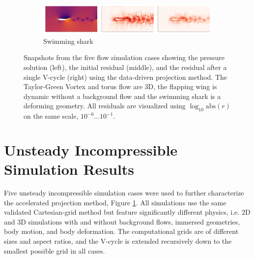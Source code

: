 \documentclass[review]{elsarticle}
\begin{document}
\begin{figure}
    \begin{subfigure}[b]{\textwidth}
        \centering
        \includegraphics[width=\textwidth]{figures/sharktriple.png}
        \caption{Swimming shark}
    \end{subfigure}
    \hfill
    \caption{Snapshots from the five flow simulation cases showing the pressure solution (left), the initial residual (middle), and the residual after a single V-cycle (right) using the data-driven projection method. The Taylor-Green Vortex and torus flow are 3D, the flapping wing is dynamic without a background flow and the swimming shark is a deforming geometry. All residuals are visualized using $\log_{10}\text{abs}(r)$ on the same scale, $10^{-6} \ldots 10^{-1}$.}
    \label{fig:simulation cases}
\end{figure}

\section{Unsteady Incompressible Simulation Results}

Five unsteady incompressible simulation cases were used to further characterize the accelerated projection method, Figure \ref{fig:simulation cases}. All simulations use the same validated Cartesian-grid method \cite{maertens2015accurate} but feature significantly different physics, i.e. 2D and 3D simulations with and without background flows, immersed geometries, body motion, and body deformation. The computational grids are of different sizes and aspect ratios, and the V-cycle is extended recursively down to the smallest possible grid in all cases. 
\end{document}
